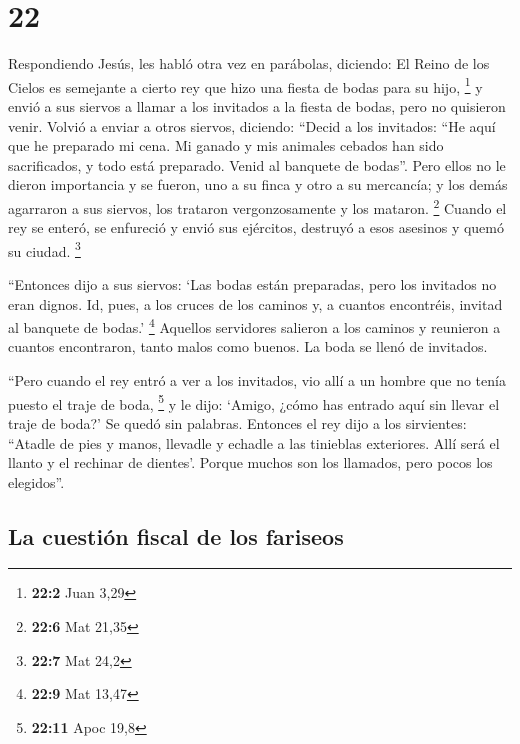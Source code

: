 \hypertarget{section-21}{%
\section{22}\label{section-21}}

 Respondiendo Jesús, les habló otra vez en parábolas,
diciendo:  El Reino de los Cielos es semejante a cierto
rey que hizo una fiesta de bodas para su hijo, \footnote{\textbf{22:2}
  Juan 3,29}  y envió a sus siervos a llamar a los
invitados a la fiesta de bodas, pero no quisieron venir. 
Volvió a enviar a otros siervos, diciendo: ``Decid a los invitados: ``He
aquí que he preparado mi cena. Mi ganado y mis animales cebados han sido
sacrificados, y todo está preparado. Venid al banquete de bodas''.
 Pero ellos no le dieron importancia y se fueron, uno a su
finca y otro a su mercancía;  y los demás agarraron a sus
siervos, los trataron vergonzosamente y los mataron. \footnote{\textbf{22:6}
  Mat 21,35}  Cuando el rey se enteró, se enfureció y
envió sus ejércitos, destruyó a esos asesinos y quemó su ciudad.
\footnote{\textbf{22:7} Mat 24,2}

 ``Entonces dijo a sus siervos: `Las bodas están
preparadas, pero los invitados no eran dignos.  Id, pues,
a los cruces de los caminos y, a cuantos encontréis, invitad al banquete
de bodas.' \footnote{\textbf{22:9} Mat 13,47}  Aquellos
servidores salieron a los caminos y reunieron a cuantos encontraron,
tanto malos como buenos. La boda se llenó de invitados.

 ``Pero cuando el rey entró a ver a los invitados, vio
allí a un hombre que no tenía puesto el traje de boda, \footnote{\textbf{22:11}
  Apoc 19,8}  y le dijo: `Amigo, ¿cómo has entrado aquí
sin llevar el traje de boda?' Se quedó sin palabras. 
Entonces el rey dijo a los sirvientes: ``Atadle de pies y manos,
llevadle y echadle a las tinieblas exteriores. Allí será el llanto y el
rechinar de dientes'.  Porque muchos son los llamados,
pero pocos los elegidos''.

\hypertarget{la-cuestiuxf3n-fiscal-de-los-fariseos}{%
\subsection{La cuestión fiscal de los
fariseos}\label{la-cuestiuxf3n-fiscal-de-los-fariseos}}

